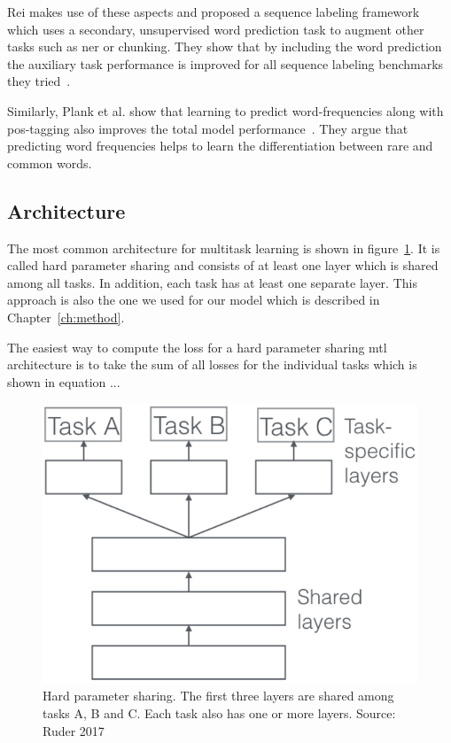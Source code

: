 Rei makes use of these aspects and proposed a sequence labeling framework which uses a secondary, unsupervised word prediction task to augment other tasks such as \gls{ner} or chunking. They show that by including the word prediction the auxiliary task performance is improved for all sequence labeling benchmarks they tried~\cite{Rei2017}.

Similarly, Plank et al. show that learning to predict word-frequencies along with \gls{pos}-tagging also improves the total model performance~\cite{Plank}. They argue that predicting word frequencies helps to learn the differentiation between rare and common words.


\subsection{Architecture}
The most common architecture for multitask learning is shown in figure~\ref{fig:03_mtl_architecture}. It is called hard parameter sharing and consists of at least one layer which is shared among all tasks. In addition, each task has at least one separate layer. This approach is also the one we used for our model which is described in Chapter~\ref{ch:method}. 

The easiest way to compute the loss for a hard parameter sharing \gls{mtl} architecture is to take the sum of all losses for the individual tasks which is shown in equation ...


\begin{figure}[ht]
	\centering
	\includegraphics[scale=0.5]{figures/03_theory/03_mtl_architecture}
	\caption{Hard parameter sharing. The first three layers are shared among tasks A, B and C. Each task also has one or more layers. Source: Ruder 2017~\cite{Ruder2017}}
	\label{fig:03_mtl_architecture}
\end{figure}



